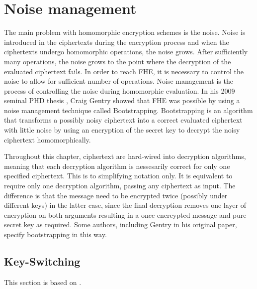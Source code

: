 \chapter{Noise management}
\label{chp:noise}

The main problem with homomorphic encryption schemes is the noise. Noise is introduced in the ciphertexts during the encryption process and when the ciphertexts undergo homomorphic operations, the noise grows. After sufficiently many operations, the noise grows to the point where the decryption of the evaluated ciphertext fails. In order to reach FHE, it is necessary to control the noise to allow for sufficient number of operations. Noise management is the process of controlling the noise during homomorphic evaluation. In his 2009 seminal PHD thesis \cite{Gentry-Thesis}, Craig Gentry showed that FHE was possible by using a noise management technique called Bootstrapping. Bootstrapping is an algorithm that transforms a possibly noisy ciphertext into a correct evaluated ciphertext with little noise by using an encryption of the secret key to decrypt the noisy ciphertext homomorphically.

Throughout this chapter, ciphertext are hard-wired into decryption algorithms, meaning that each decryption algorithm is nessesarily correct for only one specified ciphertext. This is to simplifying notation only. It is equivalent to require only one decryption algorithm, passing any ciphertext as input. The difference is that the message need to be encrypted twice (possibly under different keys) in the latter case, since the final decryption removes one layer of encryption on both arguments resulting in a once encreypted message and pure secret key as required. Some authors, including Gentry in his original paper, specify bootstrapping in this way. 

\section{Key-Switching}
This section is based on \cite{Bra18-survey}.

